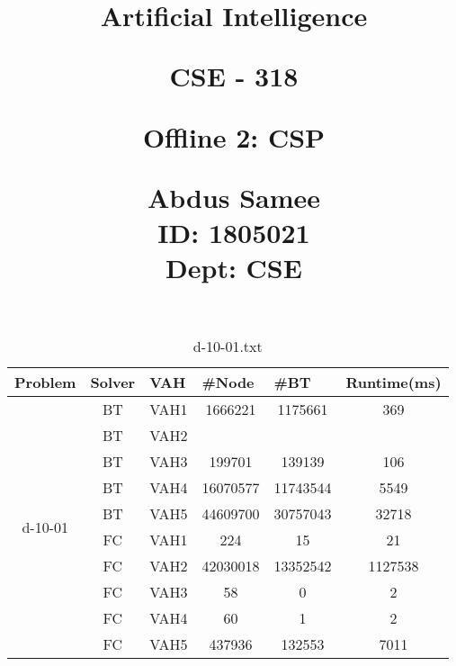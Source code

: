 \documentclass{article}
\title{%
  \begin{center}
        \vspace*{1cm}
            
        \Huge
        \textbf{Artificial Intelligence}
            
        \vspace{0.5cm}
        \LARGE
        CSE - 318
            
        \vspace{1.5cm}
            
        \textbf{Offline 2: CSP}
                        
        \vspace{0.8cm}
                        
        \Large
        Abdus Samee\\
        ID: 1805021\\
        Dept: CSE\\
    \end{center}
  }
\date{}
\begin{document}
\maketitle
\newpage

\begin{table}[]
\caption{d-10-01.txt}
\begin{tabular}{|c|c|c|c|c|c|}
\hline
Problem                   & Solver & \multicolumn{1}{l|}{VAH} & \multicolumn{1}{l|}{\#Node} & \multicolumn{1}{l|}{\#BT} & \multicolumn{1}{l|}{Runtime(ms)} \\ \hline
\multirow{10}{*}{d-10-01} & BT     & VAH1                     & 1666221                     & 1175661                   & 369                              \\ \cline{2-6} 
 & BT & VAH2 &          &           &       \\ \cline{2-6} 
 & BT & VAH3 & 199701   & 139139    & 106   \\ \cline{2-6} 
 & BT & VAH4 & 16070577 & 11743544  & 5549  \\ \cline{2-6} 
 & BT & VAH5 & 44609700 & 30757043  & 32718 \\ \cline{2-6} 
 & FC & VAH1 & 224      & 15        & 21    \\ \cline{2-6} 
 & FC & VAH2 & 42030018 & 13352542  & 1127538  \\ \cline{2-6} 
 & FC & VAH3 & 58       & 0         & 2     \\ \cline{2-6} 
 & FC & VAH4 & 60       & 1         & 2     \\ \cline{2-6} 
 & FC & VAH5 & 437936   & 132553         & 7011      \\ \hline
\end{tabular}
\end{table}
\end{document}
